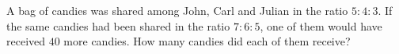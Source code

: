 A bag of candies was shared among John, Carl and Julian in the ratio $5:4:3$. If the same candies had been shared in the ratio $7:6:5$, one of them would have received $40$ more candies. How many candies did each of them receive?
